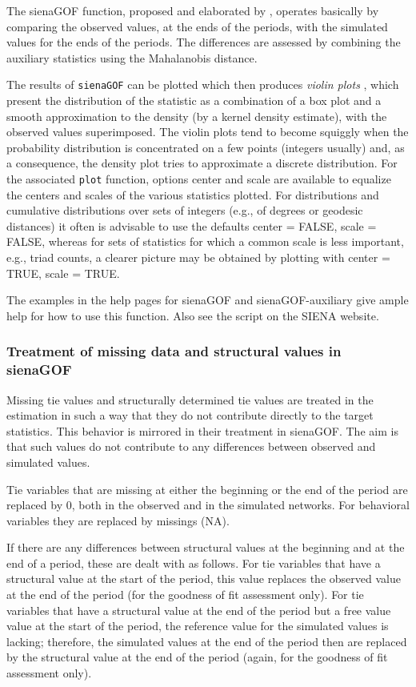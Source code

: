 \documentclass[a4paper,fleqn,11pt]{article}
\newcommand{\+}{\, + \,}
\newcommand{\sfn}[1]{\textsf{#1}}
\newcommand{\SI}{{\sf SIENA }}
\begin{document}
The \sfn{sienaGOF} function, proposed and elaborated by
\citet{Lospinoso2012}, operates basically by comparing
the observed values, at the ends of the periods, with the
simulated values for the ends of the periods.
The differences are assessed by combining the auxiliary statistics
using the Mahalanobis distance.

The results of \verb!sienaGOF! can be plotted which then produces
\emph{violin plots} \citep{HintzeNelson1998}, which present
the distribution of the statistic as a combination
of a box plot and a smooth approximation to the density
(by a kernel density estimate), with the observed values superimposed.
The violin plots tend to become squiggly when the probability distribution
is concentrated on a few points (integers usually) and, as a consequence,
the density plot tries to approximate a discrete distribution.
For the associated \verb!plot! function, options \sfn{center} and \sfn{scale}
are available to equalize the centers and scales of the various statistics
plotted.
For distributions and cumulative distributions over sets of integers
(e.g., of degrees or geodesic distances)
it often is advisable to use the defaults \sfn{center = FALSE},
\sfn{scale = FALSE}, whereas for sets of statistics for which a common scale
is less important, e.g., triad counts, a clearer picture may be obtained by
plotting with \sfn{center = TRUE}, \sfn{scale = TRUE}.

The examples in the help pages for \sfn{sienaGOF} and \sfn{sienaGOF-auxiliary}
give ample help for how to use this function.
Also see the script on the \SI website.

\subsubsection{Treatment of missing data and structural values in \sfn{sienaGOF} }

Missing tie values and structurally determined tie values are treated
in the estimation in such a way that they do not contribute directly
to the target statistics. This behavior is mirrored in their treatment
in \sfn{sienaGOF}. The aim is that such values do not contribute
to any differences between observed and simulated values.

Tie variables that are missing at either the beginning or the end of the period
are replaced by 0, both in the observed and in the simulated networks.
For behavioral variables they are replaced by missings (NA).

If there are any differences between structural values at the beginning and
at the end of a period, these are dealt with as follows.
For tie variables that have a structural value at the start of the period,
this value replaces the observed value at the end of the period
(for the goodness of fit assessment only).
For tie variables that have a structural value at the end of the period
but a free value value at the start of the period, the reference value for
the simulated values is lacking; therefore, the simulated values at the end
of the period then are replaced by the structural value at the end of the period
(again, for the goodness of fit assessment only).
\end{document}

